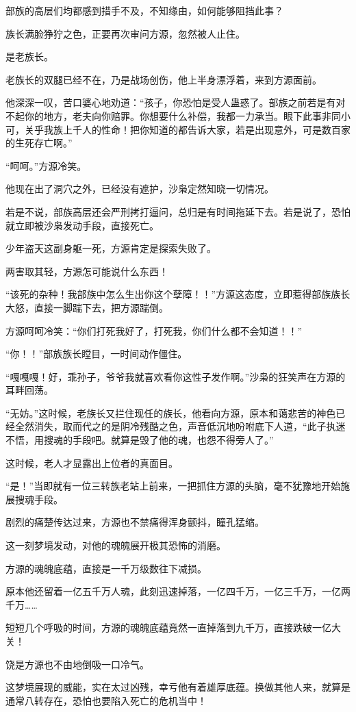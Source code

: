 \begin{this_body}
部族的高层们均都感到措手不及，不知缘由，如何能够阻挡此事？

族长满脸狰狞之色，正要再次审问方源，忽然被人止住。

是老族长。

老族长的双腿已经不在，乃是战场创伤，他上半身漂浮着，来到方源面前。

他深深一叹，苦口婆心地劝道：“孩子，你恐怕是受人蛊惑了。部族之前若是有对不起你的地方，老夫向你赔罪。你想要什么补偿，我都一力承当。眼下此事非同小可，关乎我族上千人的性命！把你知道的都告诉大家，若是出现意外，可是数百家的生死存亡啊。”

“呵呵。”方源冷笑。

他现在出了洞穴之外，已经没有遮护，沙枭定然知晓一切情况。

若是不说，部族高层还会严刑拷打逼问，总归是有时间拖延下去。若是说了，恐怕就立即被沙枭发动手段，直接死亡。

少年盗天这副身躯一死，方源肯定是探索失败了。

两害取其轻，方源怎可能说什么东西！

“该死的杂种！我部族中怎么生出你这个孽障！！”方源这态度，立即惹得部族族长大怒，直接一脚踹下去，把方源踹倒。

方源呵呵冷笑：“你们打死我好了，打死我，你们什么都不会知道！！”

“你！！”部族族长瞠目，一时间动作僵住。

“嘎嘎嘎！好，乖孙子，爷爷我就喜欢看你这性子发作啊。”沙枭的狂笑声在方源的耳畔回荡。

“无妨。”这时候，老族长又拦住现任的族长，他看向方源，原本和蔼悲苦的神色已经全然消失，取而代之的是阴冷残酷之色，声音低沉地吩咐底下人道，“此子执迷不悟，用搜魂的手段吧。就算是毁了他的魂，也怨不得旁人了。”

这时候，老人才显露出上位者的真面目。

“是！”当即就有一位三转族老站上前来，一把抓住方源的头脑，毫不犹豫地开始施展搜魂手段。

剧烈的痛楚传达过来，方源也不禁痛得浑身颤抖，瞳孔猛缩。

这一刻梦境发动，对他的魂魄展开极其恐怖的消磨。

方源的魂魄底蕴，直接是一千万级数往下减损。

原本他还留着一亿五千万人魂，此刻迅速掉落，一亿四千万，一亿三千万，一亿两千万……

短短几个呼吸的时间，方源的魂魄底蕴竟然一直掉落到九千万，直接跌破一亿大关！

饶是方源也不由地倒吸一口冷气。

这梦境展现的威能，实在太过凶残，幸亏他有着雄厚底蕴。换做其他人来，就算是通常八转存在，恐怕也要陷入死亡的危机当中！


\end{this_body}
